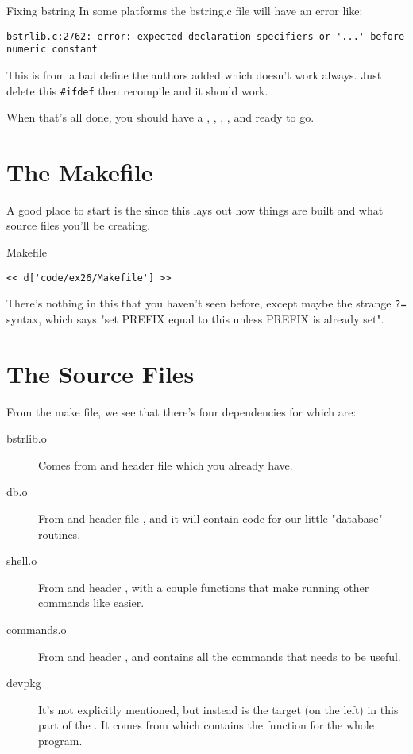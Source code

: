 \begin{aside}{Fixing bstring}
In some platforms the bstring.c file will have an error like:

\begin{lstlisting}
bstrlib.c:2762: error: expected declaration specifiers or '...' before numeric constant
\end{lstlisting}

This is from a bad define the authors added which doesn't work always.  Just
delete this \verb|#ifdef| then recompile and it should work.
\end{aside}

When that's all done, you should have a , ,
, , and  ready to go.

\section{The Makefile}

A good place to start is the  since this lays out 
how things are built and what source files you'll be creating.

\begin{code}{Makefile}
\begin{lstlisting}
<< d['code/ex26/Makefile'] >>
\end{lstlisting}
\end{code}

There's nothing in this that you haven't seen before, except maybe the strange
\verb|?=| syntax, which says "set PREFIX equal to this unless PREFIX is already
set".

\section{The Source Files}

From the make file, we see that there's four dependencies for 
which are:

\begin{description}
\item[bstrlib.o] Comes from  and header file  which
    you already have.
\item[db.o] From  and header file , and it
    will contain code for our little "database" routines.
\item[shell.o] From  and header , with a couple
    functions that make running other commands like  easier.
\item[commands.o] From  and header , and
    contains all the commands that  needs to be useful.
\item[devpkg] It's not explicitly mentioned, but instead is the target
    (on the left) in this part of the . It comes from
     which contains the  function for the whole
    program.
\end{description}

